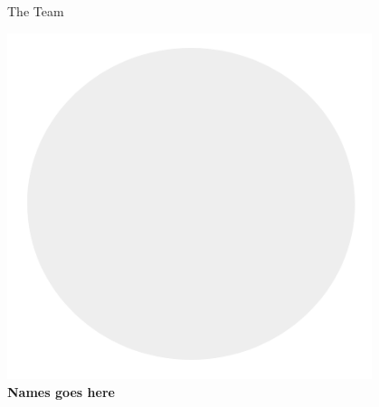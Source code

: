 \documentclass{beamer}
\begin{document}
\begin{frame}[t]{The Team}
\begin{minipage}{0.3\linewidth}
\begin{center}
		\end{center}
	\end{minipage}
	\hfill
	\begin{minipage}{0.3\linewidth}
		\begin{center}
			\includegraphics[width=0.8\textwidth]{show-team/avatar-placeholder.png}\\
		\textbf{Names goes here}
		\end{center}
	\end{minipage} \\~\\~\\


\end{frame}
\end{document}
